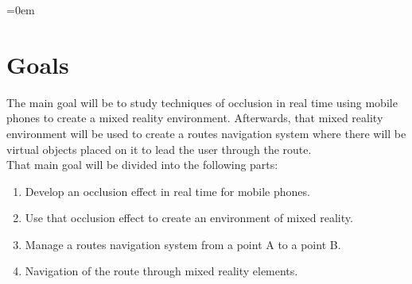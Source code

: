 \parindent=0em

\section{Goals}
\noindent

The main goal will be to study techniques of occlusion in real time using mobile phones to create a mixed reality environment. Afterwards, that mixed reality environment will be used to create a routes navigation system where there will be virtual objects placed on it to lead the user through the route.\\

That main goal will be divided into the following parts:

\begin{enumerate}[label=\arabic*)]
    \item Develop an occlusion effect in real time for mobile phones.
    
    \item Use that occlusion effect to create an environment of mixed reality.
    
    \item Manage a routes navigation system from a point A to a point B.
    
    \item Navigation of the route through mixed reality elements.
    
\end{enumerate}










